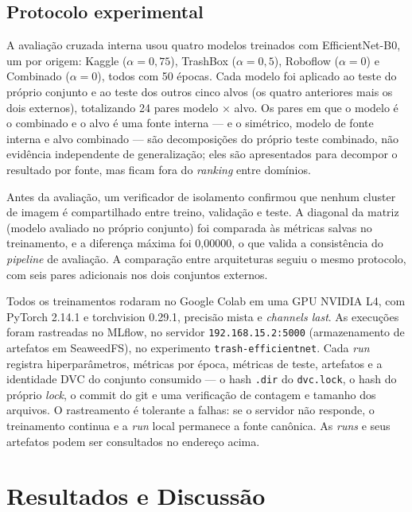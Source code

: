 \documentclass[11pt,a4paper]{article}
\begin{document}
	\subsection{Protocolo experimental}
	
	A avaliação cruzada interna usou quatro modelos treinados com EfficientNet-B0, um por origem: Kaggle ($\alpha = 0{,}75$), TrashBox ($\alpha = 0{,}5$), Roboflow ($\alpha = 0$) e Combinado ($\alpha = 0$), todos com 50 épocas. Cada modelo foi aplicado ao teste do próprio conjunto e ao teste dos outros cinco alvos (os quatro anteriores mais os dois externos), totalizando 24 pares modelo $\times$ alvo. Os pares em que o modelo é o combinado e o alvo é uma fonte interna --- e o simétrico, modelo de fonte interna e alvo combinado --- são decomposições do próprio teste combinado, não evidência independente de generalização; eles são apresentados para decompor o resultado por fonte, mas ficam fora do \emph{ranking} entre domínios.
	
	Antes da avaliação, um verificador de isolamento confirmou que nenhum cluster de imagem é compartilhado entre treino, validação e teste. A diagonal da matriz (modelo avaliado no próprio conjunto) foi comparada às métricas salvas no treinamento, e a diferença máxima foi 0,00000, o que valida a consistência do \emph{pipeline} de avaliação. A comparação entre arquiteturas seguiu o mesmo protocolo, com seis pares adicionais nos dois conjuntos externos.
	
	Todos os treinamentos rodaram no Google Colab em uma GPU NVIDIA L4, com PyTorch 2.14.1 e torchvision 0.29.1, precisão mista e \emph{channels last}. As execuções foram rastreadas no MLflow, no servidor \texttt{192.168.15.2:5000} (armazenamento de artefatos em SeaweedFS), no experimento \texttt{trash-efficientnet}. Cada \emph{run} registra hiperparâmetros, métricas por época, métricas de teste, artefatos e a identidade DVC do conjunto consumido --- o hash \texttt{.dir} do \texttt{dvc.lock}, o hash do próprio \emph{lock}, o commit do git e uma verificação de contagem e tamanho dos arquivos. O rastreamento é tolerante a falhas: se o servidor não responde, o treinamento continua e a \emph{run} local permanece a fonte canônica. As \emph{runs} e seus artefatos podem ser consultados no endereço acima.
	
	\section{Resultados e Discussão}
	\label{sec:resultados}
	
\end{document}
